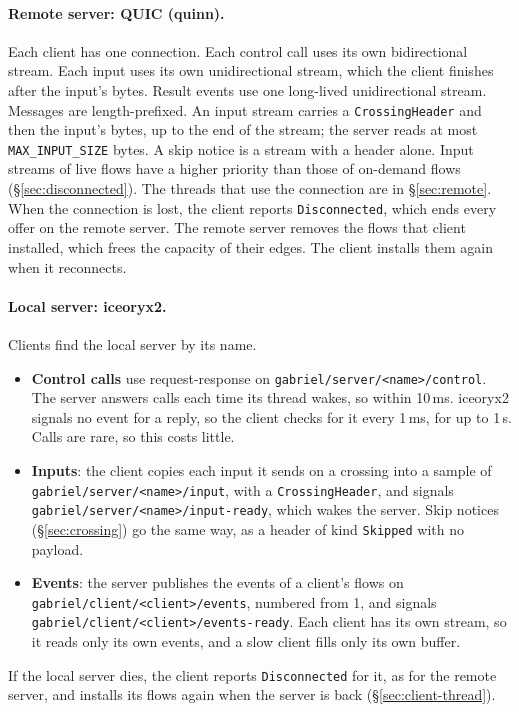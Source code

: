 \documentclass[11pt]{article}
\newcommand{\code}[1]{\texttt{#1}}
\begin{document}
\paragraph{Remote server: QUIC (quinn).} Each client has one connection. Each
control call uses its own bidirectional stream. Each input uses its own
unidirectional stream, which the client finishes after the input's bytes.
Result events use one long-lived unidirectional stream. Messages are
length-prefixed. An input stream carries a \code{CrossingHeader} and then the
input's bytes, up to the end of the stream; the server reads at most
\code{MAX\_INPUT\_SIZE} bytes. A skip notice is a stream with a header alone.
Input streams of live flows have a higher priority than
those of on-demand flows (\S\ref{sec:disconnected}). The threads that use the
connection are in \S\ref{sec:remote}. When the connection is
lost, the client reports
\code{Disconnected}, which ends every offer on the remote server. The remote
server removes the flows that client installed, which frees the capacity of
their edges. The client installs them again when it reconnects.

\paragraph{Local server: iceoryx2.} Clients find the local server by its
name.
\begin{itemize}[nosep]
  \item \textbf{Control calls} use request-response on
        \nolinkurl{gabriel/server/<name>/control}. The server answers calls
        each time its thread wakes, so within 10\,ms. iceoryx2 signals no
        event for a reply, so the client checks for it every 1\,ms, for up to
        1\,s. Calls are rare, so this costs little.
  \item \textbf{Inputs}: the client copies each input it sends on a crossing
        into a sample of \nolinkurl{gabriel/server/<name>/input}, with a
        \code{CrossingHeader}, and signals
        \nolinkurl{gabriel/server/<name>/input-ready}, which wakes the
        server. Skip notices (\S\ref{sec:crossing}) go the same way, as a
        header of kind \code{Skipped} with no payload.
  \item \textbf{Events}: the server publishes the events of a client's flows
        on \nolinkurl{gabriel/client/<client>/events}, numbered from 1, and
        signals \nolinkurl{gabriel/client/<client>/events-ready}. Each client
        has its own stream, so it reads only its own events, and a slow client
        fills only its own buffer.
\end{itemize}
If the local server dies, the client reports \code{Disconnected} for it, as
for the remote server, and installs its flows again when the server is back
(\S\ref{sec:client-thread}).
\end{document}
